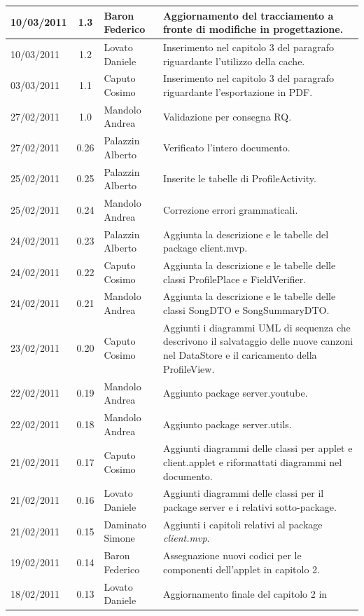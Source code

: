 \begin{longtable}{|p{}|c|p{}|p{}|}
\hline
10/03/2011 & 1.3 & Baron Federico & Aggiornamento del tracciamento a fronte
di modifiche in progettazione.\\
\hline
10/03/2011 & 1.2 & Lovato Daniele & Inserimento nel capitolo 3 del paragrafo
riguardante l'utilizzo della cache.\\
\hline
03/03/2011 & 1.1 & Caputo Cosimo & Inserimento nel capitolo 3 del paragrafo
riguardante l'esportazione in PDF.\\
\hline
27/02/2011 & 1.0 & Mandolo Andrea & Validazione per consegna RQ.\\
\hline
27/02/2011 & 0.26 & Palazzin Alberto & Verificato l'intero documento.\\
\hline
25/02/2011 & 0.25 & Palazzin Alberto & Inserite le tabelle di ProfileActivity.\\
\hline
25/02/2011 & 0.24 & Mandolo Andrea & Correzione errori grammaticali.\\
\hline
24/02/2011 & 0.23 & Palazzin Alberto & Aggiunta la descrizione e le tabelle
del package client.mvp.\\
\hline
24/02/2011 & 0.22 & Caputo Cosimo & Aggiunta la descrizione e le tabelle
delle classi ProfilePlace e FieldVerifier.\\
\hline
24/02/2011 & 0.21 & Mandolo Andrea & Aggiunta la descrizione e le tabelle
delle classi SongDTO e SongSummaryDTO.\\
\hline
23/02/2011 & 0.20 & Caputo Cosimo & Aggiunti i diagrammi UML di sequenza
che descrivono il salvataggio delle nuove canzoni nel DataStore e il caricamento della ProfileView.\\
\hline
22/02/2011 & 0.19 & Mandolo Andrea & Aggiunto package server.youtube.\\
\hline
22/02/2011 & 0.18 & Mandolo Andrea & Aggiunto package server.utils.\\
\hline
21/02/2011 & 0.17 & Caputo Cosimo & Aggiunti diagrammi delle classi per applet
e client.applet e riformattati diagrammi nel documento.\\
\hline
21/02/2011 & 0.16 & Lovato Daniele & Aggiunti diagrammi delle classi per il
package server e i relativi sotto-package.\\
\hline
21/02/2011 & 0.15 & Daminato Simone & Aggiunti i capitoli relativi al package
\emph{client.mvp}.\\
\hline
19/02/2011 & 0.14 & Baron Federico & Assegnazione nuovi codici per le componenti
dell'applet in capitolo 2.\\
\hline
18/02/2011 & 0.13 & Lovato Daniele & Aggiornamento finale del capitolo 2 in

\end{longtable}
